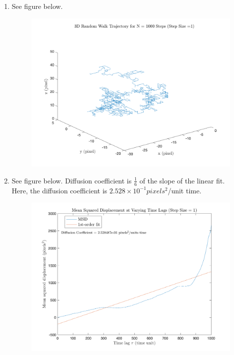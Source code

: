 
\begin{enumerate}
    \item See figure below.
    \begin{figure}[h!]
        \centering
        \includegraphics[height=0.41\textheight]{4A.png}
        \end{figure}
    \item
    See figure below. Diffusion coefficient is $\frac{1}{6}$ of the slope of the linear fit.\\
    Here, the diffusion coefficient is $2.528\times 10^{-1} pixels^{2}$/unit time.
    \begin{figure}[h!]
    \centering
           \includegraphics[height=0.41\textheight]{4B.png}
    \end{figure}

\end{enumerate}

